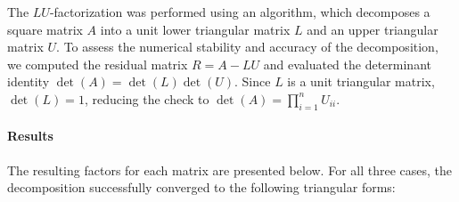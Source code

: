 \begin{solution}

	The $LU$-factorization was performed using an algorithm, which decomposes a
	square matrix $A$ into a unit lower triangular matrix $L$ and an upper
	triangular matrix $U$. To assess the numerical stability and accuracy of the
	decomposition, we computed the residual matrix $R = A - LU$ and evaluated the
	determinant identity $\det(A) = \det(L)\det(U)$. Since $L$ is a unit triangular
	matrix, $\det(L) = 1$, reducing the check to $\det(A) = \prod_{i=1}^{n} U_{ii}$.

	\paragraph{Results}
	The resulting factors for each matrix are presented below. For all three
	cases, the decomposition successfully converged to the following triangular
	forms:


\end{solution}
